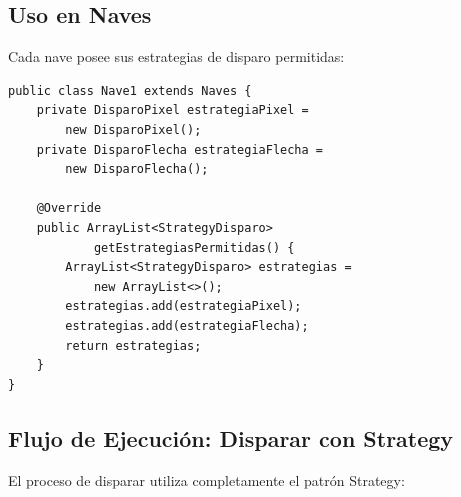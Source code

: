 \documentclass[12pt]{article}
\begin{document}
\subsection{Uso en Naves}

Cada nave posee sus estrategias de disparo permitidas:

\begin{lstlisting}
public class Nave1 extends Naves {
    private DisparoPixel estrategiaPixel = 
        new DisparoPixel();
    private DisparoFlecha estrategiaFlecha = 
        new DisparoFlecha();
    
    @Override
    public ArrayList<StrategyDisparo> 
            getEstrategiasPermitidas() {
        ArrayList<StrategyDisparo> estrategias = 
            new ArrayList<>();
        estrategias.add(estrategiaPixel);
        estrategias.add(estrategiaFlecha);
        return estrategias;
    }
}
\end{lstlisting}

\subsection{Flujo de Ejecución: Disparar con Strategy}

El proceso de disparar utiliza completamente el patrón Strategy:
\end{document}
